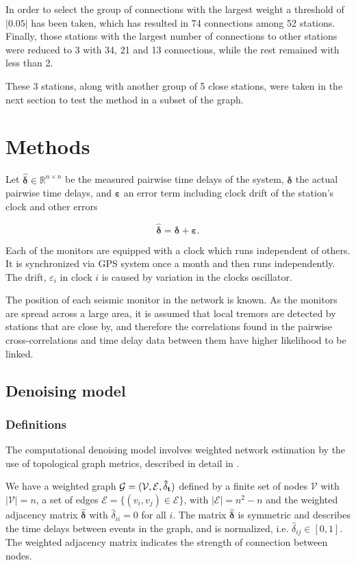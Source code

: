\documentclass[12pt,a4paper,english]{article}
\begin{document}
In order to select the group of connections with the largest weight a threshold of $|0.05|$ has been taken, which has resulted in 74 connections among 52 stations. Finally, those stations with the largest number of connections to other stations were reduced to 3 with 34, 21 and 13 connections, while the rest remained with less than 2. 

These 3 stations, along with another group of 5 close stations, were taken in the next section to test the method in a subset of the graph.


\section{Methods}

Let $\bm{\hat{\delta}} \in \mathbb{R}^{n\times n}$ be the measured pairwise time delays of the system, $\bm{\delta}$ the actual pairwise time delays, and $\bm{\varepsilon}$ an error term including clock drift of the station's clock and other errors

\begin{equation}
\bm{\hat{\delta}}  = \bm{\delta} + \bm{\varepsilon}.
\label{eq:model}
\end{equation}
 
Each of the monitors are equipped with a clock which runs independent of others. It is synchronized via GPS system once a month and then runs independently. The drift, $\varepsilon_i$ in clock $i$ is caused by variation in the clocks oscillator.  

The position of each seismic monitor in the network is known. As the monitors are spread across a large area, it is assumed that local tremors are detected by stations that are close by, and therefore the correlations found in the pairwise cross-correlations and time delay data between them have higher likelihood to be linked. 

\subsection{Denoising model}\label{sec:denoising}
\subsubsection{Definitions}
The computational denoising model involves weighted network estimation by the use of topological graph metrics, described in detail in \cite{Spyrou2017}. 

We have a weighted graph $\mathcal{G} = (\mathcal{V}, \mathcal{E}, \bf{\hat{\delta}}_t)$ defined by a finite set of nodes $\mathcal{V}$ with $|\mathcal{V}| = n$, a set of edges $\mathcal{E} = \{ (v_i,v_j) \in \mathcal{E} \}$, with $|\mathcal{E}| = n^2-n$ and the weighted adjacency matrix $\bm{\hat{\delta}}$ with $\hat{\delta}_{ii} = 0$ for all $i$. The matrix $\bm{\hat{\delta}}$  is symmetric and describes the time delays between events in the graph, and is normalized, i.e. $\hat{\delta}_{ij}\in [0,1]$. The weighted adjacency matrix indicates the strength of connection between nodes. %
\end{document}
